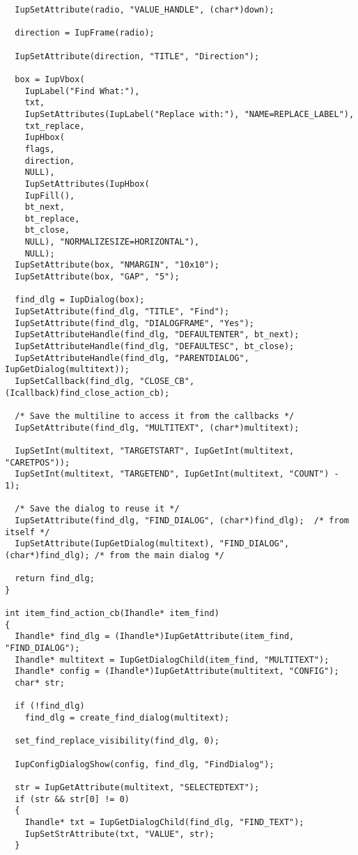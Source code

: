 \documentclass{ctexart}
\begin{document}
\begin{lstlisting}
  IupSetAttribute(radio, "VALUE_HANDLE", (char*)down);

  direction = IupFrame(radio);

  IupSetAttribute(direction, "TITLE", "Direction");

  box = IupVbox(
    IupLabel("Find What:"),
    txt,
    IupSetAttributes(IupLabel("Replace with:"), "NAME=REPLACE_LABEL"),
    txt_replace,
    IupHbox(
    flags,
    direction,
    NULL),
    IupSetAttributes(IupHbox(
    IupFill(),
    bt_next,
    bt_replace,
    bt_close,
    NULL), "NORMALIZESIZE=HORIZONTAL"),
    NULL);
  IupSetAttribute(box, "NMARGIN", "10x10");
  IupSetAttribute(box, "GAP", "5");

  find_dlg = IupDialog(box);
  IupSetAttribute(find_dlg, "TITLE", "Find");
  IupSetAttribute(find_dlg, "DIALOGFRAME", "Yes");
  IupSetAttributeHandle(find_dlg, "DEFAULTENTER", bt_next);
  IupSetAttributeHandle(find_dlg, "DEFAULTESC", bt_close);
  IupSetAttributeHandle(find_dlg, "PARENTDIALOG", IupGetDialog(multitext));
  IupSetCallback(find_dlg, "CLOSE_CB", (Icallback)find_close_action_cb);

  /* Save the multiline to access it from the callbacks */
  IupSetAttribute(find_dlg, "MULTITEXT", (char*)multitext);

  IupSetInt(multitext, "TARGETSTART", IupGetInt(multitext, "CARETPOS"));
  IupSetInt(multitext, "TARGETEND", IupGetInt(multitext, "COUNT") - 1);

  /* Save the dialog to reuse it */
  IupSetAttribute(find_dlg, "FIND_DIALOG", (char*)find_dlg);  /* from itself */
  IupSetAttribute(IupGetDialog(multitext), "FIND_DIALOG", (char*)find_dlg); /* from the main dialog */

  return find_dlg;
}

int item_find_action_cb(Ihandle* item_find)
{
  Ihandle* find_dlg = (Ihandle*)IupGetAttribute(item_find, "FIND_DIALOG");
  Ihandle* multitext = IupGetDialogChild(item_find, "MULTITEXT");
  Ihandle* config = (Ihandle*)IupGetAttribute(multitext, "CONFIG");
  char* str;

  if (!find_dlg)
    find_dlg = create_find_dialog(multitext);

  set_find_replace_visibility(find_dlg, 0);

  IupConfigDialogShow(config, find_dlg, "FindDialog");

  str = IupGetAttribute(multitext, "SELECTEDTEXT");
  if (str && str[0] != 0)
  {
    Ihandle* txt = IupGetDialogChild(find_dlg, "FIND_TEXT");
    IupSetStrAttribute(txt, "VALUE", str);
  }


\end{lstlisting}
\end{document}
